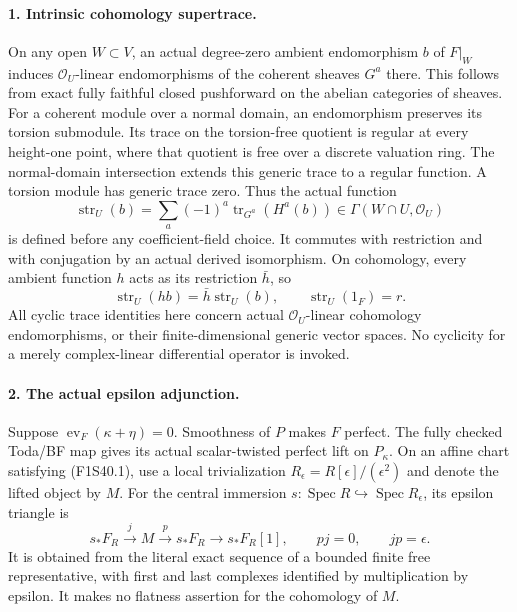 \paragraph{1. Intrinsic cohomology supertrace.}
On any open $W\subset V$, an actual degree-zero ambient
endomorphism $b$ of $F|_W$ induces $\mathcal O_U$-linear
endomorphisms of the coherent sheaves $G^a$ there.
This follows from exact fully faithful closed pushforward
on the abelian categories of sheaves. For a coherent
module over a normal domain, an endomorphism preserves
its torsion submodule. Its trace on the torsion-free
quotient is regular at every height-one point, where
that quotient is free over a discrete valuation ring.
The normal-domain intersection extends this generic
trace to a regular function. A torsion module has
generic trace zero. Thus the actual function
\[
       \operatorname{str}_U(b)=
         \sum_a(-1)^a\operatorname{tr}_{G^a}(H^a(b))
              \in\Gamma(W\cap U,\mathcal O_U)
 \tag{F1S40.4}
\]
is defined before any coefficient-field choice.
It commutes with restriction and with conjugation by
an actual derived isomorphism. On cohomology, every
ambient function $h$ acts as its restriction $\bar h$,
so
\[
 \operatorname{str}_U(hb)=\bar h\operatorname{str}_U(b),
       \qquad\operatorname{str}_U(1_F)=r.
 \tag{F1S40.5}
\]
All cyclic trace identities here concern actual
$\mathcal O_U$-linear cohomology endomorphisms,
or their finite-dimensional generic vector spaces.
No cyclicity for a merely complex-linear differential
operator is invoked.

\paragraph{2. The actual epsilon adjunction.}
Suppose $\operatorname{ev}_F(\kappa+\eta)=0$.
Smoothness of $P$ makes $F$ perfect. The fully checked
Toda/BF map gives its actual scalar-twisted perfect
lift on $P_\kappa$. On an affine chart satisfying
(F1S40.1), use a local trivialization
$R_\epsilon=R[\epsilon]/(\epsilon^2)$ and denote
the lifted object by $M$. For the central immersion
$s:\operatorname{Spec}R\hookrightarrow
\operatorname{Spec}R_\epsilon$, its epsilon triangle is
\[
 s_*F_R\xrightarrow{j}M\xrightarrow{p}s_*F_R
       \longrightarrow s_*F_R[1],
       \qquad pj=0,\qquad jp=\epsilon.
 \tag{F1S40.6}
\]
It is obtained from the literal exact sequence of a
bounded finite free representative, with first and
last complexes identified by multiplication by epsilon.
It makes no flatness assertion for the cohomology of $M$.

